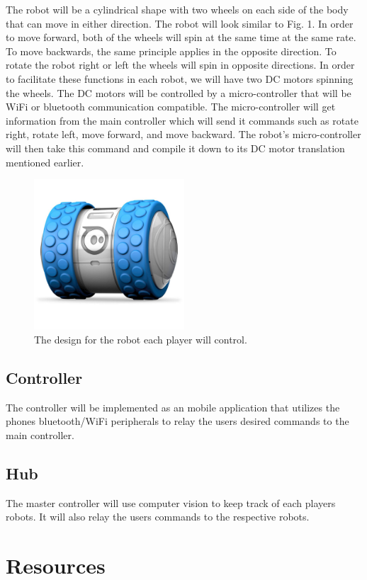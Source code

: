 \documentclass[11pt]{ieeeconf}
\begin{document}
The robot will be a cylindrical shape with two wheels on each side of the body that can move in either direction. The robot will look similar to Fig. 1. In order to move forward, both of the wheels will spin at the same time at the same rate. To move backwards, the same principle applies in the opposite direction. To rotate the robot right or left the wheels will spin in opposite directions. In order to facilitate these functions in each robot, we will have two DC motors spinning the wheels. The DC motors will be controlled by a micro-controller that will be WiFi or bluetooth communication compatible. The micro-controller will get information from the main controller which will send it commands such as rotate right, rotate left, move forward, and move backward. The robot's micro-controller will then take this command and compile it down to its DC motor translation mentioned earlier.

 \begin{figure}[h]
  \centering
      \includegraphics[width=0.5\textwidth]{images/SumoBot.png}
        \caption{The design for the robot each player will control.}
        \label{RobotFig}
\end{figure}

\subsection{Controller}

The controller will be implemented as an mobile application that utilizes the phones bluetooth/WiFi peripherals to relay the users desired commands to the main controller.

\subsection{Hub}

The master controller will use computer vision to keep track of each players robots. It will also relay the users commands to the respective robots.

\section{Resources}



% 
% 
\end{document}
